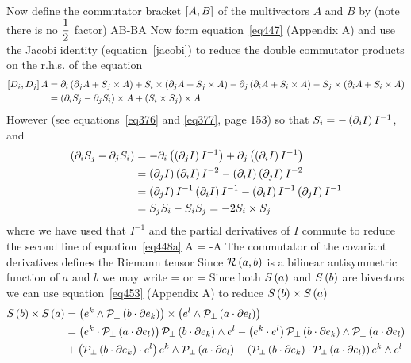 Now define the commutator bracket $\left [ {A},{B}\right ]$ of the multivectors $A$ and $B$ by (note there is no $\displaystyle\frac{1}{2}$ factor)
\be
  \equiv AB-BA
\ee
Now form equation~\ref{eq447} (Appendix A) and use the Jacobi identity (equation~\ref{jacobi}) to reduce the double commutator products on the r.h.s. of the equation
\begin{align}
\left [ {D_{i}},{D_{j}}\right ]A &= \partial_{i}\left ( {\partial_{j}A+S_{j}\times A} \right )+S_{i}\times\left ( {\partial_{j}A+S_{j}\times A} \right )
                      -\partial_{j}\left ( {\partial_{i}A+S_{i}\times A} \right )-S_{j}\times\left ( {\partial_{i}A+S_{i}\times A} \right ) \nonumber \\
                     &= \left ( {\partial_{i}S_{j}-\partial_{j}S_{i}} \right )\times A +\left ( {S_{i}\times S_{j}} \right )\times A \label{eq448}
\end{align}
However (see equations~\ref{eq376} and \ref{eq377}, page 153) so that $S_{i} = -\left ( {\partial_{i}I} \right ) I^{-1}$, and
\begin{align}
 \left ( {\partial_{i}S_{j}-\partial_{j}S_{i}} \right ) &= -\partial_{i}\left ( {\left ( {\partial_{j}I} \right ) I^{-1}} \right )+\partial_{j}\left ( {\left ( {\partial_{i}I} \right ) I^{-1}} \right ) \nonumber \\
                                             &= \left ( {\partial_{j}I} \right )\left ( {\partial_{i}I} \right ) I^{-2}-\left ( {\partial_{i}I} \right )\left ( {\partial_{j}I} \right ) I^{-2} \nonumber \\
                                             &= \left ( {\partial_{j}I} \right ) I^{-1}\left ( {\partial_{i}I} \right ) I^{-1}-\left ( {\partial_{i}I} \right ) I^{-1}\left ( {\partial_{j}I} \right ) I^{-1} \nonumber \\
                                             &= S_{j}S_{i}-S_{i}S_{j} = -2S_{i}\times S_{j} \label{eq448a}
\end{align}
where we have used that $I^{-1}$ and the partial derivatives of $I$ commute to reduce the second line of equation~\ref{eq448a}
\be\label{eq8_30}
A = -\times A
\ee
The commutator of the covariant derivatives defines the Riemann tensor
\be\label{eq451}
  \equiv {}
\ee
Since ${\mathcal{R}}\left ( {a,b} \right )$ is a bilinear antisymmetric function of $a$ and $b$ we may write
\be\label{eq452}
  = 
\ee
or
\be
  = 
\ee
Since both ${S}\left ( {a} \right )$ and ${S}\left ( {b} \right )$ are bivectors we can use equation~\ref{eq453} (Appendix A) to reduce ${S}\left ( {b} \right )\times{S}\left ( {a} \right )$
\begin{align}
{S}\left ( {b} \right )\times{S}\left ( {a} \right ) &= \left ( {e^{k}\wedge{\mathcal{P}_{\perp}}\left ( {b\cdot\partial e_{k}} \right )} \right )\times\left ( {e^{l}\wedge{\mathcal{P}_{\perp}}\left ( {a\cdot\partial e_{l}} \right )} \right ) \nonumber \\
                       &= \left ( {e^{k}\cdot{\mathcal{P}_{\perp}}\left ( {a\cdot\partial e_{l}} \right )} \right ){\mathcal{P}_{\perp}}\left ( {b\cdot\partial e_{k}} \right )\wedge e^{l}
                       -\left ( {e^{k}\cdot e^{l}} \right ){\mathcal{P}_{\perp}}\left ( {b\cdot\partial e_{k}} \right )\wedge{\mathcal{P}_{\perp}}\left ( {a\cdot\partial e_{l}} \right ) \nonumber \\
                       & +\left ( {{\mathcal{P}_{\perp}}\left ( {b\cdot\partial e_{k}} \right )\cdot e^{l}} \right ) e^{k}\wedge{\mathcal{P}_{\perp}}\left ( {a\cdot\partial e_{l}} \right ) 
                       -\left ( {{\mathcal{P}_{\perp}}\left ( {b\cdot\partial e_{k}} \right )\cdot {\mathcal{P}_{\perp}}\left ( {a\cdot\partial e_{l}} \right )} \right ) e^{k}\wedge e^{l} \label{eq452}
\end{align}
